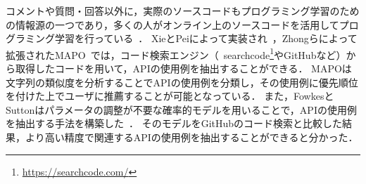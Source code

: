

%
%

コメントや質問・回答以外に，実際のソースコードもプログラミング学習のための情報源の一つであり，多くの人がオンライン上のソースコードを活用してプログラミング学習を行っている~\cite{Brandt:2009:TSO:1518701.1518944}．
XieとPeiによって実装され~\cite{MAPO}，Zhongらによって拡張されたMAPO~\cite{extended_MAPO}では，コード検索エンジン（~searchcode\footnote{\url{https://searchcode.com/}}やGitHubなど）から取得したコードを用いて，APIの使用例を抽出することができる．
MAPOは文字列の類似度を分析することでAPIの使用例を分類し，その使用例に優先順位を付けた上でユーザに推薦することが可能となっている．
また，FowkesとSuttonはパラメータの調整が不要な確率的モデルを用いることで，APIの使用例を抽出する手法を構築した~\cite{GitHubAPIMining}．
そのモデルをGitHubのコード検索と比較した結果，より高い精度で関連するAPIの使用例を抽出することができると分かった．

